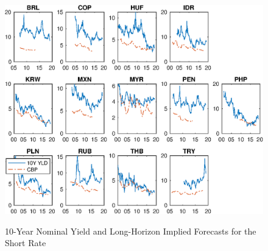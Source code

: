 \documentclass{article}
\begin{document}
\begin{figure}[tbph]
	\begin{center}
		\caption{10-Year Nominal Yield and Long-Horizon Implied Forecasts for the Short Rate}
		\label{fig:YLD10Y_CBP}
		\includegraphics[trim={0cm 0cm 0cm 0cm},clip,height=1\textheight,width=1.4\textwidth]{../Figures/Data/YLD10Y_CBP.eps} \\
	\end{center}
\end{figure}
\end{document}
